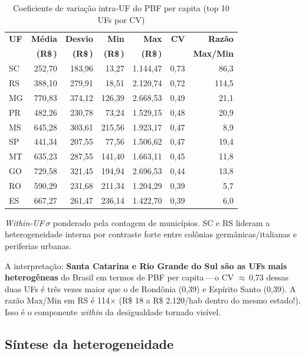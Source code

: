 \documentclass[12pt,a4paper,oneside]{article}
\newcommand{\rs}{R\$\,}
\begin{document}
\begin{table}[H]\centering\small
\caption{Coeficiente de variação intra-UF do PBF per capita
(top 10 UFs por CV)}
\label{tab:intra}
\begin{tabular}{lrrrrrr}
\toprule
\textbf{UF} & \textbf{Média} & \textbf{Desvio} & \textbf{Min} & \textbf{Max} & \textbf{CV} & \textbf{Razão} \\
            & \textbf{(\rs)} & \textbf{(\rs)}  & \textbf{(\rs)} & \textbf{(\rs)} &  & \textbf{Max/Min} \\
\midrule
SC & 252{,}70 & 183{,}96 & 13{,}27 & 1.144{,}47 & 0{,}73 & 86{,}3 \\
RS & 388{,}10 & 279{,}91 & 18{,}51 & 2.120{,}74 & 0{,}72 & 114{,}5 \\
MG & 770{,}83 & 374{,}12 & 126{,}39 & 2.668{,}53 & 0{,}49 & 21{,}1 \\
PR & 482{,}26 & 230{,}78 & 73{,}24 & 1.529{,}15 & 0{,}48 & 20{,}9 \\
MS & 645{,}28 & 303{,}61 & 215{,}56 & 1.923{,}17 & 0{,}47 & 8{,}9 \\
SP & 441{,}34 & 207{,}55 & 77{,}56 & 1.506{,}62 & 0{,}47 & 19{,}4 \\
MT & 635{,}23 & 287{,}55 & 141{,}40 & 1.663{,}11 & 0{,}45 & 11{,}8 \\
GO & 729{,}58 & 321{,}45 & 194{,}94 & 2.696{,}53 & 0{,}44 & 13{,}8 \\
RO & 590{,}29 & 231{,}68 & 211{,}34 & 1.204{,}29 & 0{,}39 & 5{,}7 \\
ES & 667{,}27 & 261{,}47 & 236{,}14 & 1.422{,}70 & 0{,}39 & 6{,}0 \\
\bottomrule
\end{tabular}
\flushleft\footnotesize \textit{Within-UF}\,$\sigma$ ponderado pela
contagem de municípios. SC e RS lideram a heterogeneidade interna por
contraste forte entre colônias germânicas/italianas e periferias urbanas.
\end{table}

A interpretação: \textbf{Santa Catarina e Rio Grande do Sul são as UFs
mais heterogêneas} do Brasil em termos de PBF per capita\,---\,o CV
$\approx$\,0{,}73 dessas duas UFs é três vezes maior que o de Rondônia
(0{,}39) e Espírito Santo (0{,}39). A razão Max/Min em RS é 114$\times$
(R\$ 18 a R\$ 2.120/hab dentro do mesmo estado!). Isso é o componente
\textit{within} da desigualdade tornado visível.

\subsection{Síntese da heterogeneidade}
\end{document}
